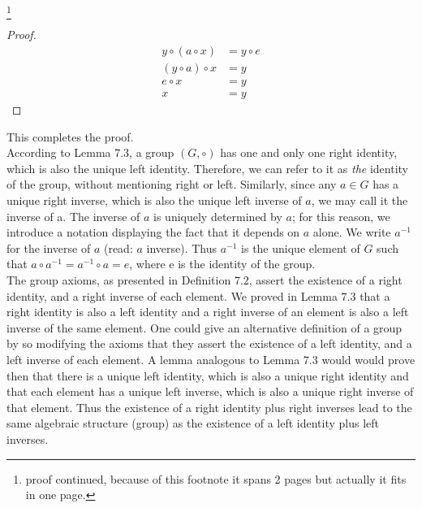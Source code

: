 \documentclass[11pt]{amsbook}
\begin{document}
	\footnote{proof continued, because of this footnote it spans 2 pages but actually it fits in one page.}
	\begin{proof}
		\begin{align*}
			y \circ (a \circ x) &= y \circ e\\
			(y \circ a) \circ x &= y\\
			e \circ x &= y\\
			x &= y
		\end{align*}
	\end{proof}
	This completes the proof.\\
	
	According to Lemma 7.3, a group $(G, \circ)$ has one and only one right
	identity, which is also the unique left identity. Therefore, we can refer
	to it as \textit{the} identity of the group, without mentioning right or left.
	Similarly, since any $a \in G$ has a unique right inverse, which is also the
	unique left inverse of $a$, we may call it the inverse of a. The inverse of $a$
	is uniquely determined by $a$; for this reason, we introduce a notation
	displaying the fact that it depends on $a$ alone. We write $a^{-1}$ for the
	inverse of $a$ (read: $a$ inverse). Thus $a^{-1}$ is the unique element of $G$ such
	that $a \circ a^{-1} = a^{-1} \circ a = e$, where e is the identity of the group.\\
	
	The group axioms, as presented in Definition 7.2, assert the existence of
	a right identity, and a right inverse of each element. We proved in
	Lemma 7.3 that a right identity is also a left identity and a right inverse
	of an element is also a left inverse of the same element. One could give
	an alternative definition of a group by so modifying the axioms that
	they assert the existence of a left identity, and a left inverse of each
	element. A lemma analogous to Lemma 7.3 would would prove then that there
	is a unique left identity, which is also a unique right identity and that
	each element has a unique left inverse, which is also a unique right
	inverse of that element. Thus the existence of a right identity plus right
	inverses lead to the same algebraic structure (group) as the existence of
	a left identity plus left inverses.\\
	
\end{document}
